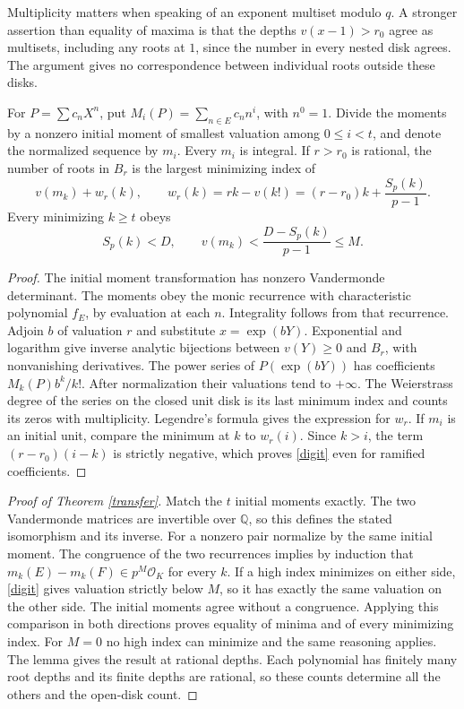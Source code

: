 \documentclass[11pt]{article}
\newcommand{\Q}{\mathbb Q}\newcommand{\Z}{\mathbb Z}
\begin{document}
Multiplicity matters when speaking of an exponent multiset modulo $q$. A stronger assertion than equality of maxima is that the depths $v(x-1)>r_0$ agree as multisets, including any roots at $1$, since the number in every nested disk agrees. The argument gives no correspondence between individual roots outside these disks.

\begin{lemma}\label{moment}
For $P=\sum c_nX^n$, put $M_i(P)=\sum_{n\in E} c_n n^i$, with $n^0=1$. Divide the moments by a nonzero initial moment of smallest valuation among $0\le i<t$, and denote the normalized sequence by $m_i$. Every $m_i$ is integral. If $r>r_0$ is rational, the number of roots in $B_r$ is the largest minimizing index of
\[
 v(m_k)+w_r(k),\qquad
 w_r(k)=rk-v(k!)=(r-r_0)k+\frac{S_p(k)}{p-1}.
\]
Every minimizing $k\ge t$ obeys
\begin{equation}\label{digit}
 S_p(k)<D,\qquad v(m_k)<\frac{D-S_p(k)}{p-1}\le M .
\end{equation}
\end{lemma}
\begin{proof}
The initial moment transformation has nonzero Vandermonde determinant. The moments obey the monic recurrence with characteristic polynomial $f_E$, by evaluation at each $n$. Integrality follows from that recurrence. Adjoin $b$ of valuation $r$ and substitute $x=\exp(bY)$. Exponential and logarithm give inverse analytic bijections between $v(Y)\ge0$ and $B_r$, with nonvanishing derivatives. The power series of $P(\exp(bY))$ has coefficients $M_k(P)b^k/k!$. After normalization their valuations tend to $+\infty$. The Weierstrass degree of the series on the closed unit disk is its last minimum index and counts its zeros with multiplicity. Legendre's formula gives the expression for $w_r$. If $m_i$ is an initial unit, compare the minimum at $k$ to $w_r(i)$. Since $k>i$, the term $(r-r_0)(i-k)$ is strictly negative, which proves \eqref{digit} even for ramified coefficients.
\end{proof}

\begin{proof}[Proof of Theorem \ref{transfer}]
Match the $t$ initial moments exactly. The two Vandermonde matrices are invertible over $\Q$, so this defines the stated isomorphism and its inverse. For a nonzero pair normalize by the same initial moment. The congruence of the two recurrences implies by induction that $m_k(E)-m_k(F)\in p^M\mathcal O_K$ for every $k$. If a high index minimizes on either side, \eqref{digit} gives valuation strictly below $M$, so it has exactly the same valuation on the other side. The initial moments agree without a congruence. Applying this comparison in both directions proves equality of minima and of every minimizing index. For $M=0$ no high index can minimize and the same reasoning applies. The lemma gives the result at rational depths. Each polynomial has finitely many root depths and its finite depths are rational, so these counts determine all the others and the open-disk count.
\end{proof}
\end{document}
